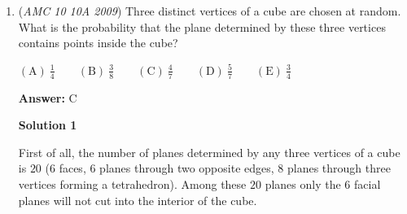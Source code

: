 \begin{enumerate}
 



\textbf{Solution 3 (Fakesolve)}

The easiest way for the areas of the triangles to be equal would be if they were congruent \href{https://artofproblemsolving.com/wiki/index.php/Constraints\_Strategy}{[1]}. A way for that to work would be if $ABCD$ were simply an isosceles trapezoid! Since $AC = 14$ and $AE:EC = 3:4$ (look at the side lengths and you'll know why!), $\boxed{AE = 6}$




\textbf{Solution 4 (Easiest Way)}

Using the fact that $[AED] = [BEC]$ and the fact that $\triangle AEB \sim \triangle EDC$ (which should be trivial given the two equal triangles) we have that

 
 \[\frac{AE}{DC} = \frac{BE}{EC} = \frac{9}{12}\]

 We know that $DC=EC,$ so we have

 
 \[\frac{AE}{EC} = \frac{BE}{EC} = \frac{3}{4}\]

 Thus 

 
 \[\frac{AE}{EC} = \frac{3}{4}\]

 But $EC = 14 - AE$ so we have

 
 \[\frac{AE}{14 - AE} = \frac{3}{4}\]

 Simplifying gives $AE = \boxed{6}.$

 \textbf{Note} The two triangles that are equal in area imply that $AB$ is parallel to $DC$ which implies that $\angle{EAB} = \angle{CDE}$ and $\angle{EBA} = \angle{DCE}.$ Furthermore, since $\angle{AEB} = \angle{DEC}$ (vertical angles). By AAA similarity, $\triangle AEB \sim \triangle EDC.$



	\item (\textit{AMC 10 10A 2009}) Three distinct vertices of a cube are chosen at random. What is the probability that the plane determined by these three vertices contains points inside the cube?


 $\mathrm{(A)}\ \frac{1}{4} \qquad \mathrm{(B)}\ \frac{3}{8} \qquad \mathrm{(C)}\ \frac{4}{7} \qquad \mathrm{(D)}\ \frac{5}{7} \qquad \mathrm{(E)}\ \frac{3}{4}$

 \textbf{Answer: }C



\textbf{Solution 1}

First of all, the number of planes determined by any three vertices of a cube is $20$ ($6$ faces, $6$ planes through two opposite edges, $8$ planes through three vertices forming a tetrahedron). Among these $20$ planes only the $6$ facial planes will not cut into the interior of the cube.


\end{enumerate}
